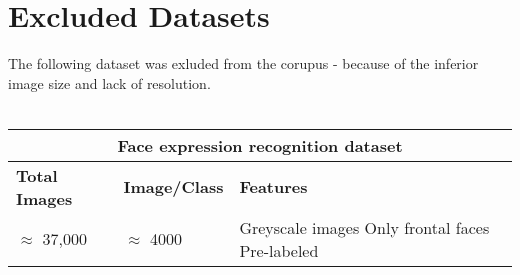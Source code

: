 \section{Excluded Datasets}
\noindent The following dataset was exluded from the corupus - because of the inferior image size and lack of resolution.\\\\
\begin{tabular}{ |p{3cm}||p{3cm} ||p{3cm} | }
    \hline
    \multicolumn{3}{|c|}{\textbf{Face expression recognition dataset \cite{KaggleDataset}}} \\
    \hline
    \textbf{Total Images} & \textbf{Image/Class } & \textbf{Features}\\
    \hline
    $\approx$ 37,000 & $\approx$ 4000 & Greyscale images Only frontal faces Pre-labeled\\
    \hline
\end{tabular}
\vspace*{1em}